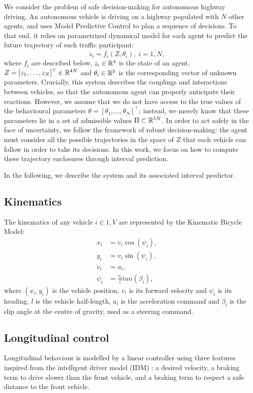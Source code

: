 \documentclass{article}
\begin{document}
We consider the problem of safe decision-making for autonomous highway driving. An autonomous vehicle is driving on a highway populated with $N$ other agents, and uses Model Predictive Control to plan a sequence of decisions. To that end, it relies on parametrized dynamical model for each agent to predict the future trajectory of each traffic participant: \[\dot{z}_i=f_i(Z,\theta_i),\;i=\overline{1,N},\] where $f_i$ are described below, $z_i\in\mathbb{R}^4$ is the state of an agent, $Z = [z_1,\dots,z_N]^\top\in\mathbb{R}^{4N}$ and $\theta_i\in\mathbb{R}^5$ is the corresponding vector of unknown parameters. Crucially, this system describes the couplings and interactions between vehicles, so that the autonomous agent can properly anticipate their reactions. 
However, we assume that we do not have access to the true values of the behavioural parameters $\theta=[\theta_1,\dots,\theta_N]^\top$; instead, we merely know that these parameters lie in a set of admissible values $\Pi\subset\mathbb{R}^{5N}$. In order to act safely in the face of uncertainty, we follow the framework of robust decision-making: the agent must consider all the possible trajectories in the space of $Z$ that each vehicle can follow in order to take its decisions. In this work, we focus on how to compute these trajectory enclosures through interval prediction.

In the following, we describe the system and its associated interval predictor.

\subsection{Kinematics}

The kinematics of any vehicle $i\in\overline{1,V}$ are represented by the Kinematic Bicycle Model:
\begin{align}
	\dot{x}_i &= v_i\cos(\psi_i), \nonumber\\
	\dot{y}_i &= v_i\sin(\psi_i), \nonumber\\
	\dot{v}_i &= a_i, \nonumber\\
	\dot{\psi}_i &= \frac{v_i}{l}tan(\beta_i), \nonumber
\end{align}
where $(x_i, y_i)$ is the vehicle position, $v_i$ is its forward velocity and $\psi_i$ is its heading, $l$ is the vehicle half-length, $a_i$ is the acceleration command and $\beta_i$ is the slip angle at the centre of gravity, used as a steering command.

\subsection{Longitudinal control}
Longitudinal behaviour is modelled by a linear controller using three features inspired from the intelligent driver model (IDM) \cite{Treiber2000}: a desired velocity, a braking term to drive slower than the front vehicle, and a braking term to respect a safe distance to the front vehicle.
\end{document}
